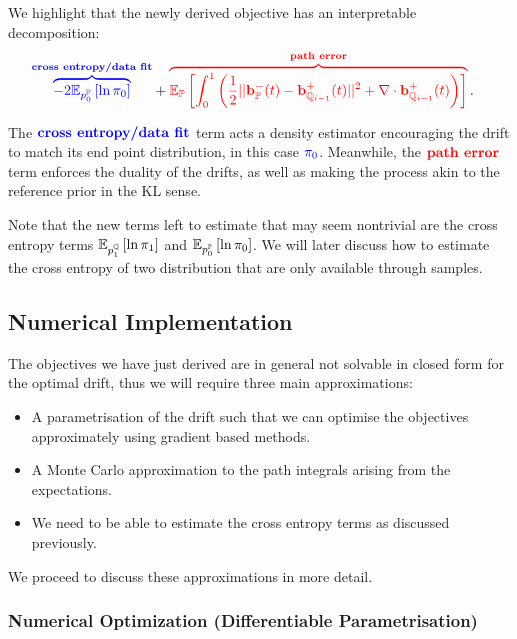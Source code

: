 \documentclass[a4paper,12pt,twoside,openright]{report}
\makeatletter
\theoremstyle{definition}
\def\mathcolor#1#{\@mathcolor{#1}}
\def\@mathcolor#1#2#3{%
  \protect\leavevmode
  \begingroup
    \color#1{#2}#3%
  \endgroup
}
\makeatother
\begin{document}
We highlight that the newly derived objective has an interpretable  decomposition:
\begin{align*}
 \mathcolor{blue}{\overbrace{-2\E_{p^{\P}_0}\left[\log \pi_0 \right]}^{\textbf{cross entropy/data fit}}} &+ \mathcolor{red}{\overbrace{\E_{\P}\left[\int_0^1 \left(\frac{1}{2}||\rvb_\P^{-}(t) - \rvb_{\Q_{i-1}}^{+}(t)||^2 + \nabla\cdot\rvb^{+}_{\Q_{i-1}}(t) \right)\right] }^{\textbf{path error}}}.
\end{align*}

The $\mathcolor{blue}{\textbf{cross entropy/data fit}}$ term acts a density estimator encouraging the drift to match its end point distribution, in this case $\mathcolor{blue}{\pi_0}$. Meanwhile, the $\mathcolor{red}{\textbf{path error}}$ term enforces the duality of the drifts, as well as making the process akin to the reference prior in the KL sense.

Note that the new terms left to estimate that may seem nontrivial are the cross entropy terms $\mathbb{E}_{p^{{\mathbb{Q}}}_1}\left[\operatorname{ln} \pi_1 \right]$ and $\mathbb{E}_{p^{{\mathbb{P}}}_0}\left[\operatorname{ln} \pi_0 \right]$. We will later discuss how to estimate the cross entropy of two distribution that are only available through samples. 

\subsection{Numerical Implementation}

The objectives we have just derived are in general not solvable in closed form for the optimal drift, thus we will require three main approximations:
\begin{itemize}
    \item A parametrisation of the drift such that we can optimise the objectives approximately using gradient based methods.
    \item A Monte Carlo approximation to the path integrals arising from the expectations.
    \item We need to be able to estimate the cross entropy terms as discussed previously.
\end{itemize}

We proceed to discuss these approximations in more detail.
\subsubsection{Numerical Optimization (Differentiable Parametrisation)}
\end{document}
